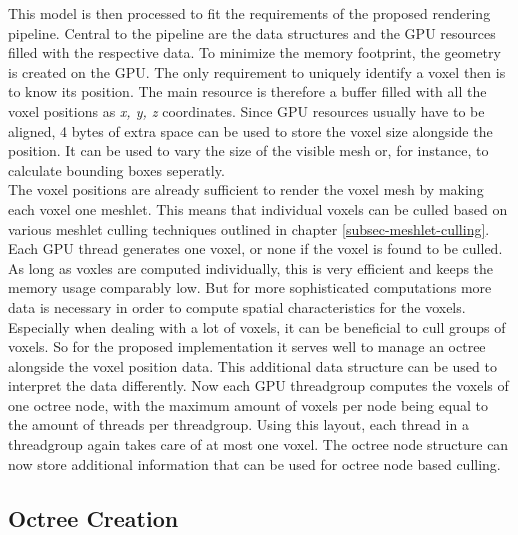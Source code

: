 \noindent
This model is then processed to fit the requirements of the proposed rendering pipeline. Central to the pipeline 
are the data structures and the \ac{GPU} resources filled with the respective data. To minimize the memory footprint,
the geometry is created on the \ac{GPU}. The only requirement to uniquely identify a voxel then is to know its position.
The main resource is therefore a buffer filled with all the voxel positions as \emph{x, y, z} coordinates. Since \ac{GPU} 
resources usually have to be aligned, 4 bytes of extra space can be used to store the voxel size alongside the position.
It can be used to vary the size of the visible mesh or, for instance, to calculate bounding boxes seperatly. \\

The voxel positions are already sufficient to render the voxel mesh by making each voxel one meshlet. This means that 
individual voxels can be culled based on various meshlet culling techniques outlined in chapter 
\ref{subsec-meshlet-culling}. Each \ac{GPU} thread generates one voxel, or none if the voxel is found to be culled. 
As long as voxles are computed individually, this is very efficient and keeps the memory usage comparably low. But for 
more sophisticated computations more data is necessary in order to compute spatial characteristics for the voxels. \\

\noindent
Especially when dealing with a lot of voxels, it can be beneficial to cull groups of voxels. So for the proposed 
implementation it serves well to manage an octree alongside the voxel position data. This additional data structure 
can be used to interpret the data differently. Now each \ac{GPU} threadgroup computes the voxels of one octree node, 
with the maximum amount of voxels per node being equal to the amount of threads per threadgroup. Using this layout, 
each thread in a threadgroup again takes care of at most one voxel. The octree node structure can now store additional 
information that can be used for octree node based culling.

\subsection*{Octree Creation} \label{subsec-octree-creation}

